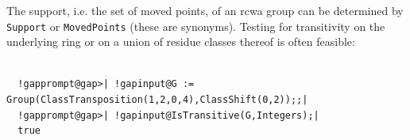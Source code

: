 \documentclass[a4paper,11pt]{report}
\begin{document}
{{    The support, i.e. the set of moved points, of an rcwa group can be determined
by \texttt{Support} or \texttt{MovedPoints} (these are synonyms). Testing for transitivity on the underlying ring or on a
union of residue classes thereof is often feasible: 
\begin{Verbatim}[commandchars=!@|,fontsize=\small,frame=single,label=Example]
  
  !gapprompt@gap>| !gapinput@G := Group(ClassTransposition(1,2,0,4),ClassShift(0,2));;|
  !gapprompt@gap>| !gapinput@IsTransitive(G,Integers);|
  true
  
\end{Verbatim}
 
}}
\end{document}
